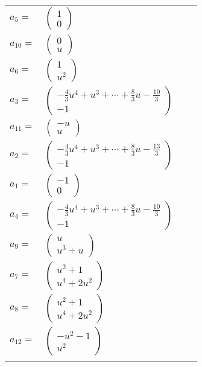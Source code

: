 \documentclass[1p]{elsarticle_modified}
\theoremstyle{definition}
\begin{document}
\begin{tabular}{m{7pt} m{180pt} m{7pt} m{180pt} }
\flushright $a_{5}=$&$\begin{pmatrix}1\\0\end{pmatrix}$ \\
\flushright $a_{10}=$&$\begin{pmatrix}0\\u\end{pmatrix}$ \\
\flushright $a_{6}=$&$\begin{pmatrix}1\\u^2\end{pmatrix}$ \\
\flushright $a_{3}=$&$\begin{pmatrix}-\frac{4}{3} u^4+u^3+\cdots+\frac{8}{3} u-\frac{10}{3}\\-1\end{pmatrix}$ \\
\flushright $a_{11}=$&$\begin{pmatrix}- u\\u\end{pmatrix}$ \\
\flushright $a_{2}=$&$\begin{pmatrix}-\frac{4}{3} u^4+u^3+\cdots+\frac{8}{3} u-\frac{13}{3}\\-1\end{pmatrix}$ \\
\flushright $a_{1}=$&$\begin{pmatrix}-1\\0\end{pmatrix}$ \\
\flushright $a_{4}=$&$\begin{pmatrix}-\frac{4}{3} u^4+u^3+\cdots+\frac{8}{3} u-\frac{10}{3}\\-1\end{pmatrix}$ \\
\flushright $a_{9}=$&$\begin{pmatrix}u\\u^3+u\end{pmatrix}$ \\
\flushright $a_{7}=$&$\begin{pmatrix}u^2+1\\u^4+2 u^2\end{pmatrix}$ \\
\flushright $a_{8}=$&$\begin{pmatrix}u^2+1\\u^4+2 u^2\end{pmatrix}$ \\
\flushright $a_{12}=$&$\begin{pmatrix}- u^2-1\\u^2\end{pmatrix}$\\&\end{tabular}
\end{document}
